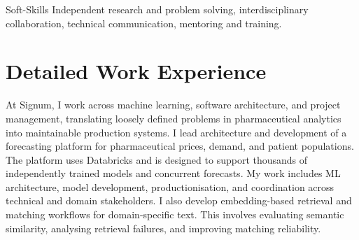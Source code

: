 \documentclass[11pt,a4paper]{moderncv}
\begin{document}
\cvitem
{Soft-Skills}
{Independent research and problem solving, interdisciplinary collaboration, technical communication, mentoring and training.}

\newpage

\section{Detailed Work Experience}

\label{sec:signum}
 {
    At Signum, I work across machine learning, software architecture, and project management, translating loosely defined problems in pharmaceutical analytics into maintainable production systems.
    \newline\hspace*{2em}
    I lead architecture and development of a forecasting platform for pharmaceutical prices, demand, and patient populations. The platform uses Databricks and is designed to support thousands of independently trained models and concurrent forecasts. My work includes ML architecture, model development, productionisation, and coordination across technical and domain stakeholders.
    \newline\hspace*{2em}
    I also develop embedding-based retrieval and matching workflows for domain-specific text. This involves evaluating semantic similarity, analysing retrieval failures, and improving matching reliability.
}{}

\label{sec:valcon}
\end{document}
